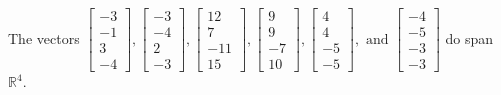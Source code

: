 \begin{exercise}
\begin{exerciseStatement}
  \end{exerciseStatement}
  \begin{exerciseAnswer}
   The vectors \(\left[\begin{array}{r}
-3 \\
-1 \\
3 \\
-4
\end{array}\right] , \left[\begin{array}{r}
-3 \\
-4 \\
2 \\
-3
\end{array}\right] , \left[\begin{array}{r}
12 \\
7 \\
-11 \\
15
\end{array}\right] , \left[\begin{array}{r}
9 \\
9 \\
-7 \\
10
\end{array}\right] , \left[\begin{array}{r}
4 \\
4 \\
-5 \\
-5
\end{array}\right] , \text{ and } \left[\begin{array}{r}
-4 \\
-5 \\
-3 \\
-3
\end{array}\right]\) 
  	 do  
	span \(\mathbb{R}^4\).
  


  \end{exerciseAnswer}
\end{exercise}